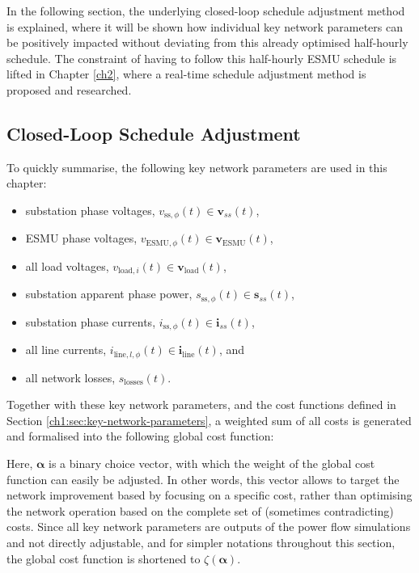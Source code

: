 In the following section, the underlying closed-loop schedule adjustment method is explained, where it will be shown how individual key network parameters can be positively impacted without deviating from this already optimised half-hourly schedule.
The constraint of having to follow this half-hourly ESMU schedule is lifted in Chapter \ref{ch2}, where a real-time schedule adjustment method is proposed and researched.

\subsection{Closed-Loop Schedule Adjustment}

To quickly summarise, the following key network parameters are used in this chapter:

\begin{itemize}
	\item substation phase voltages, $v_{\text{ss},\phi}(t) \in \textbf{v}_{ss}(t)$,
	\item ESMU phase voltages, $v_{\text{ESMU},\phi}(t) \in \textbf{v}_\text{ESMU}(t)$,
	\item all load voltages, $v_{\text{load},i}(t) \in \textbf{v}_\text{load}(t)$,
	\item substation apparent phase power, $s_{\text{ss},\phi}(t) \in \textbf{s}_{ss}(t)$,
	\item substation phase currents, $i_{\text{ss},\phi}(t) \in \textbf{i}_{ss}(t)$,
	\item all line currents, $i_{\text{line},l,\phi}(t) \in \textbf{i}_\text{line}(t)$, and
	\item all network losses, $s_\text{losses}(t)$.
\end{itemize}

Together with these key network parameters, and the cost functions defined in Section \ref{ch1:sec:key-network-parameters}, a weighted sum of all costs is generated and formalised into the following global cost function:



Here, $\boldsymbol{\alpha}$ is a binary choice vector, with which the weight of the global cost function can easily be adjusted.
In other words, this vector allows to target the network improvement based by focusing on a specific cost, rather than optimising the network operation based on the complete set of (sometimes contradicting) costs.
Since all key network parameters are outputs of the power flow simulations and not directly adjustable, and for simpler notations throughout this section, the global cost function is shortened to $\zeta(\boldsymbol{\alpha})$.

